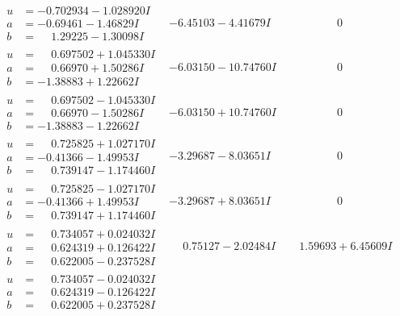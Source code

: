 \documentclass[1p]{elsarticle_modified}
\theoremstyle{definition}
\begin{document}
$$\begin{array}{c|c|c}
\begin{aligned}
u &= -0.702934 - 1.028920 I \\
a &= -0.69461 - 1.46829 I \\
b &= \phantom{-}1.29225 - 1.30098 I\end{aligned}
 & -6.45103 - 4.41679 I & \phantom{-0.000000 } 0 \\ \hline\begin{aligned}
u &= \phantom{-}0.697502 + 1.045330 I \\
a &= \phantom{-}0.66970 + 1.50286 I \\
b &= -1.38883 + 1.22662 I\end{aligned}
 & -6.03150 - 10.74760 I & \phantom{-0.000000 } 0 \\ \hline\begin{aligned}
u &= \phantom{-}0.697502 - 1.045330 I \\
a &= \phantom{-}0.66970 - 1.50286 I \\
b &= -1.38883 - 1.22662 I\end{aligned}
 & -6.03150 + 10.74760 I & \phantom{-0.000000 } 0 \\ \hline\begin{aligned}
u &= \phantom{-}0.725825 + 1.027170 I \\
a &= -0.41366 - 1.49953 I \\
b &= \phantom{-}0.739147 - 1.174460 I\end{aligned}
 & -3.29687 - 8.03651 I & \phantom{-0.000000 } 0 \\ \hline\begin{aligned}
u &= \phantom{-}0.725825 - 1.027170 I \\
a &= -0.41366 + 1.49953 I \\
b &= \phantom{-}0.739147 + 1.174460 I\end{aligned}
 & -3.29687 + 8.03651 I & \phantom{-0.000000 } 0 \\ \hline\begin{aligned}
u &= \phantom{-}0.734057 + 0.024032 I \\
a &= \phantom{-}0.624319 + 0.126422 I \\
b &= \phantom{-}0.622005 - 0.237528 I\end{aligned}
 & \phantom{-}0.75127 - 2.02484 I & \phantom{-}1.59693 + 6.45609 I \\ \hline\begin{aligned}
u &= \phantom{-}0.734057 - 0.024032 I \\
a &= \phantom{-}0.624319 - 0.126422 I \\
b &= \phantom{-}0.622005 + 0.237528 I\end{aligned}

\end{array}$$
\end{document}
